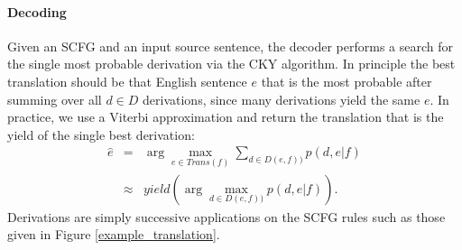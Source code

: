 \documentclass[11pt]{article}
\begin{document}
\paragraph{Decoding}

Given an SCFG and an input source sentence, the decoder performs a
search for the single most probable derivation via the CKY algorithm.
In principle the best translation should be that English sentence $e$
that is the most probable after summing over all $d\in D$ derivations,
since many derivations yield the same $e$.  In practice, we use a
Viterbi approximation and return the translation that is the yield of
the single best derivation:
\begin{eqnarray}
  \label{decoding_eq}
  \hat{e} &=& \arg \max_{e\in Trans(f)} \sum_{d\in D(e,f))}{p(d,e|f)}
  \nonumber \\
             &\approx& yield(\arg \max_{d\in D(e,f))}{p(d,e|f)}).
\end{eqnarray}
Derivations are simply successive applications on the SCFG rules such
as those given in Figure \ref{example_translation}.
\end{document}
